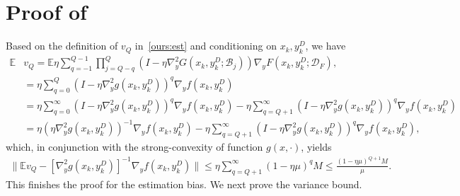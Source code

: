 \documentclass{osudissert96}
\def\gB{{\mathcal{B}}}
\def\gD{{\mathcal{D}}}
\begin{document}
\section{Proof of }
Based on the definition of $v_Q$ in~\cref{ours:est} and conditioning on $x_k,y_k^D$, we have 
\begin{align*}
\mathbb{E}&v_Q= \mathbb{E}  \eta \sum_{q=-1}^{Q-1}\prod_{j=Q-q}^Q (I - \eta \nabla_y^2G(x_k,y_k^D;\gB_j)) \nabla_y F(x_k,y_k^D;\gD_F),  \nonumber
 \\ & = \eta \sum_{q=0}^{Q} (I - \eta \nabla_y^2g(x_k,y_k^D))^q\nabla_y f(x_k,y_k^D)  \nonumber
 \\& = \eta \sum_{q=0}^{\infty} (I - \eta \nabla_y^2g(x_k,y_k^D))^q\nabla_y f(x_k,y_k^D) -\eta \sum_{q=Q+1}^{\infty} (I - \eta \nabla_y^2g(x_k,y_k^D))^q\nabla_y f(x_k,y_k^D) \nonumber
 \\& = \eta (\eta \nabla_y^2 g(x_k,y_k^D))^{-1}\nabla_y f(x_k,y_k^D) - \eta \sum_{q=Q+1}^{\infty} (I - \eta \nabla_y^2g(x_k,y_k^D))^q\nabla_y f(x_k,y_k^D), 
\end{align*}
which, in conjunction with the strong-convexity of function $g(x,\cdot)$, yields
{\small
\begin{align}\label{eq:fm}
\big\|\mathbb{E}v_Q- [\nabla_y^2 g(x_k,y^D_k)]^{-1}\nabla_y f(x_k,y_k^D) \big \| \leq \eta \sum_{q=Q+1}^{\infty}(1-\eta\mu)^{q} M\leq \frac{(1-\eta\mu)^{Q+1}M}{\mu}. 
\end{align}}
\hspace{-0.15cm}This finishes the proof for the estimation bias. 
We next prove the variance bound. 
\end{document}
